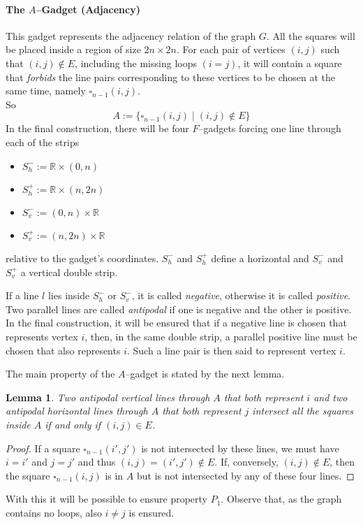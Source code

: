 \documentclass[12pt]{article}
\newtheorem{lemma}[definition]{Lemma}
\newcommand{\R}{\mathbb{R}}
\begin{document}
\paragraph{The $A$--Gadget (Adjacency)}
This gadget represents the adjacency relation of the graph $G$. All the squares will be placed inside a region of size $2n \times 2n$. For each pair of vertices $(i, j)$ such that $(i, j) \notin E$, including the missing loops $(i = j)$, it will contain a square that \textit{forbids} the line pairs corresponding to these vertices to be chosen at the same time, namely $\square_{n-1}(i, j)$.\\
So
\[ A := \{ \square_{n-1}(i, j) \mid (i, j) \notin E \} \]
In the final construction, there will be four $F$--gadgets forcing one line through each of the strips
\begin{itemize}
	\item $S_h^- := \R \times (0, n)$ 
	\item $S_h^+ := \R \times (n, 2n)$
	\item $S_v^- := (0, n) \times \R$ 
	\item $S_v^+ := (n, 2n) \times \R$
\end{itemize}
relative to the gadget's coordinates. $S_h^-$ and $S_h^+$ define a horizontal and $S_v^-$ and $S_v^+$ a vertical double strip.

If a line $l$ lies inside $S_h^-$ or $S_v^-$, it is called \textit{negative}, otherwise it is called \textit{positive}. Two parallel lines are called \textit{antipodal} if one is negative and the other is positive. In the final construction, it will be ensured that if a negative line is chosen that represents vertex $i$, then, in the same double strip, a parallel positive line must be chosen that also represents $i$. Such a line pair is then said to represent vertex $i$.

The main property of the $A$--gadget is stated by the next lemma.
\begin{lemma}\label{Lemma:AdjacencyLemma} Two antipodal vertical lines through $A$ that both represent $i$ and two antipodal horizontal lines through $A$ that both represent $j$ intersect all the squares inside $A$ if and only if $(i, j) \in E$.
\end{lemma}
\begin{proof}
If a square $\square_{n-1}(i', j')$ is not intersected by these lines, we must have $i = i'$ and $j = j'$ and thus $(i, j) = (i', j') \notin E$. If, conversely, $(i, j) \notin E$, then the square $\square_{n-1}(i, j)$ is in $A$ but is not intersected by any of these four lines. 
\end{proof}
With this it will be possible to ensure property $P_1$. Observe that, as the graph contains no loops, also $i \neq j$ is ensured.
\end{document}
